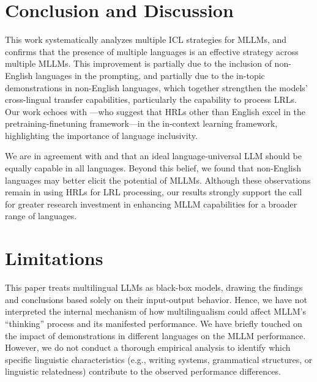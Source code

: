\section{Conclusion and Discussion}
This work systematically analyzes multiple ICL strategies for MLLMs, and confirms that the presence of multiple languages is an effective strategy across multiple MLLMs.
This improvement is partially due to the inclusion of non-English languages in the prompting, and partially due to the in-topic demonstrations in non-English languages, which together strengthen the models' cross-lingual transfer capabilities, particularly the capability to process LRLs.
Our work echoes with \citet{revisit_primacy_of_english}---who suggest that HRLs other than English excel in the pretraining-finetuning framework---in the in-context learning framework, highlighting the importance of language inclusivity.

We are in agreement with \citet{nllb} and \citet{is_translation_all_you_need} that an ideal language-universal LLM should be equally capable in all languages. 
Beyond this belief, we found that non-English languages may better elicit the potential of MLLMs.
Although these observations remain in using HRLs for LRL processing, our results strongly support the call for greater research investment in enhancing MLLM capabilities for a broader range of languages.


\section*{Limitations}
This paper treats multilingual LLMs as black-box models, drawing the findings and conclusions based solely on their input-output behavior. Hence, we have not interpreted the internal mechanism of how multilingualism could affect MLLM's ``thinking'' process and its manifested performance. We have briefly touched on the impact of demonstrations in different languages on the MLLM performance. However, we do not conduct a thorough empirical analysis to identify which specific linguistic characteristics (e.g., writing systems, grammatical structures, or linguistic relatedness) contribute to the observed performance differences.


